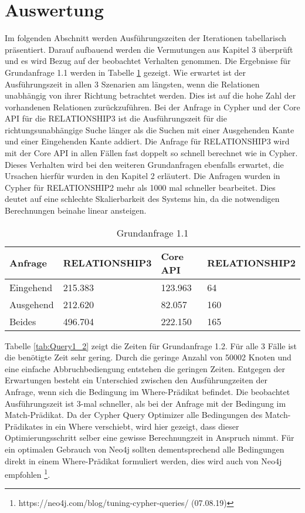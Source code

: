 \section{Auswertung}
Im folgenden Abschnitt werden Ausführungszeiten der Iterationen tabellarisch präsentiert.  Darauf aufbauend werden die Vermutungen aus Kapitel 3 überprüft und es wird Bezug auf der beobachtet Verhalten genommen. \newline \newline
Die Ergebnisse für Grundanfrage 1.1 werden  in Tabelle \ref{tab:Query1_1} gezeigt. Wie erwartet ist der Ausführungszeit in allen 3 Szenarien am längsten, wenn die Relationen unabhängig von ihrer Richtung betrachtet werden. Dies ist auf die hohe Zahl der vorhandenen Relationen zurückzuführen. Bei der Anfrage in Cypher und der Core API für die RELATIONSHIP3  ist die Ausführungszeit für die richtungsunabhängige Suche länger als die Suchen mit einer Ausgehenden Kante und einer Eingehenden Kante addiert. \newline
Die Anfrage für RELATIONSHIP3 wird mit der Core API in  allen Fällen fast doppelt so schnell berechnet wie in Cypher. Dieses Verhalten wird bei den weiteren Grundanfragen ebenfalls erwartet, die Ursachen hierfür wurden in den Kapitel 2 erläutert. \newline
Die Anfragen wurden in Cypher für RELATIONSHIP2 mehr als 1000 mal schneller bearbeitet. Dies deutet auf eine schlechte Skalierbarkeit des Systems hin, da die notwendigen Berechnungen beinahe linear ansteigen. 
\FloatBarrier  
\begin{table}[h]
\centering
\begin{tabular}{ |p{3cm}||p{3cm}|p{3cm}|p{3cm}|  }
	\hline
	Anfrage& RELATIONSHIP3 &Core API&RELATIONSHIP2\\
	\hline
	Eingehend   & 215.383    &123.963&  64\\
	Ausgehend&    212.620  & 82.057   & 160\\
	Beides&496.704 & 222.150&  165\\
	\hline
\end{tabular}
\caption{Grundanfrage 1.1}
\label{tab:Query1_1}
\end{table}
\FloatBarrier
Tabelle \ref{tab:Query1_2} zeigt die Zeiten für Grundanfrage 1.2. Für alle 3 Fälle ist die benötigte Zeit sehr gering. Durch die geringe Anzahl von 50002 Knoten und eine einfache Abbruchbediengung entstehen die geringen Zeiten. \newline Entgegen der Erwartungen besteht ein Unterschied zwischen den Ausführungzeiten der Anfrage, wenn sich die Bedingung im Where-Prädikat befindet. Die beobachtet Ausführungszeit ist 3-mal schneller, als bei der Anfrage mit der Bedingung im Match-Prädikat. Da der Cypher Query Optimizer alle Bedingungen des Match-Prädikates in ein Where verschiebt, wird hier gezeigt, dass dieser Optimierungsschritt selber eine gewisse Berechnungzeit in Anspruch nimmt. Für ein optimalen Gebrauch von Neo4j sollten dementsprechend alle Bedingungen direkt in einem Where-Prädikat formuliert werden, dies wird auch von Neo4j empfohlen \footnote{https://neo4j.com/blog/tuning-cypher-queries/ (07.08.19)}. \newline
